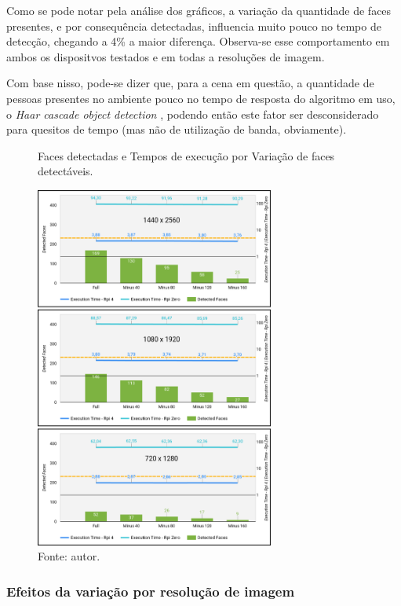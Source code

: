 Como se pode notar pela análise dos gráficos, a variação da quantidade de faces presentes, e por consequência detectadas, influencia muito pouco no tempo de detecção, chegando a 4\% a maior diferença. Observa-se esse comportamento em ambos os dispositvos testados e em todas a resoluções de imagem.

Com base nisso, pode-se dizer que, para a cena em questão, a quantidade de pessoas presentes no ambiente pouco no tempo de resposta do algoritmo em uso, o \textit{Haar cascade object detection} \cite{Viola2001}, podendo então este fator ser desconsiderado para quesitos de tempo (mas não de utilização de banda, obviamente).

\begin{figure}
    \centering
    \caption[Faces detectadas e Tempos de execução por Variação de faces detectáveis.]{Faces detectadas e Tempos de execução por Variação de faces detectáveis.}
    \includegraphics[width=0.7\textwidth]{Cap4_Experimentos_Realizados/Figures/cena1_graficos_variacao_faces.jpg}
    \caption*{Fonte: autor.}
    \label{fig:dadosCena1_graficos_variacao_faces}
\end{figure}

\subsubsection{Efeitos da variação por resolução de imagem}

